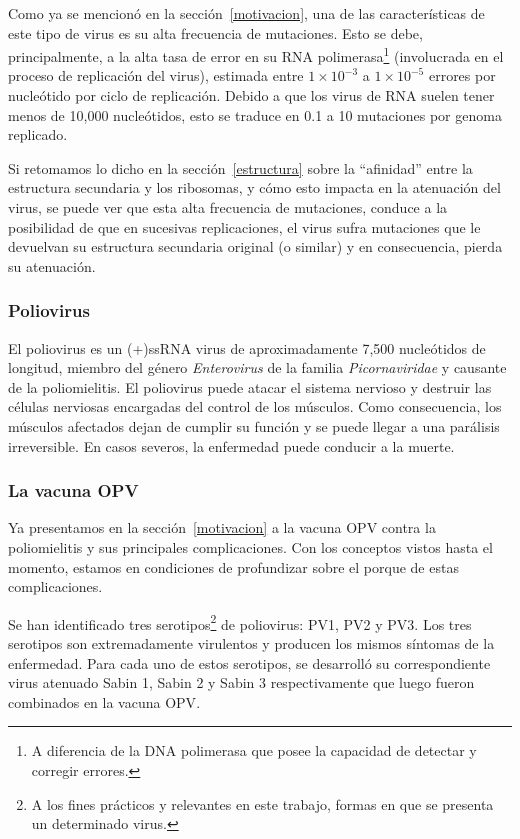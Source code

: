 Como ya se mencion\'o en la secci\'on~\ref{motivacion}, una de las
caracter\'isticas de este tipo de virus es su alta frecuencia de mutaciones.
Esto se debe, principalmente, a la alta tasa de error en su \ac{RNA}
polimerasa\footnote{A diferencia de la \ac{DNA} polimerasa que posee la
capacidad de detectar y corregir errores.} (involucrada en el proceso de
replicaci\'on del virus), estimada entre $1\times10^{-3}$ a $1\times10^{-5}$
errores por nucle\'otido por ciclo de replicaci\'on\cite{Vignuzzi08}. Debido a
que los virus de \ac{RNA} suelen tener menos de 10,000 nucle\'otidos, esto se
traduce en 0.1 a 10 mutaciones por genoma replicado.

Si retomamos lo dicho en la secci\'on~\ref{estructura} sobre la ``afinidad''
entre la estructura secundaria y los ribosomas, y c\'omo esto impacta en la
atenuaci\'on del virus, se puede ver que esta alta frecuencia de mutaciones,
conduce a la posibilidad de que en sucesivas replicaciones, el virus sufra
mutaciones que le devuelvan su estructura secundaria original (o similar) y en
consecuencia, pierda su atenuaci\'on.

\subsubsection{Poliovirus}

El poliovirus es un \ac{(+)ssRNA virus} de aproximadamente 7,500 nucle\'otidos
de longitud, miembro del g\'enero \textit{Enterovirus} de la familia
\textit{Picornaviridae} y causante de la poliomielitis. El poliovirus puede
atacar el sistema nervioso y destruir las c\'elulas nerviosas encargadas del
control de los m\'usculos. Como consecuencia, los m\'usculos afectados dejan de
cumplir su funci\'on y se puede llegar a una par\'alisis irreversible. En casos
severos, la enfermedad puede conducir a la muerte.

\subsubsection{La vacuna \ac{OPV}}

Ya presentamos en la secci\'on~\ref{motivacion} a la vacuna \ac{OPV} contra la
poliomielitis y sus principales complicaciones. Con los conceptos vistos
hasta el momento, estamos en condiciones de profundizar sobre el
porque de estas complicaciones.

Se han identificado tres serotipos\footnote{A los fines pr\'acticos y relevantes
en este trabajo, formas en que se presenta un determinado virus.} de poliovirus:
\ac{PV1}, \ac{PV2} y \ac{PV3}. Los tres serotipos son extremadamente virulentos
y producen los mismos s\'intomas de la enfermedad. Para cada uno de estos
serotipos, se desarroll\'o  su correspondiente virus atenuado Sabin 1, Sabin 2 y
Sabin 3 respectivamente que luego fueron combinados en la vacuna \ac{OPV}.

